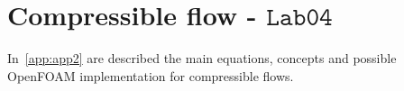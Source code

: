 
\section{Compressible flow - $\mathtt{Lab04}$}
    
    \renewcommand{\thepage}{\arabic{page}}
    \setcounter{page}{\thelastPage}
In~\ref{app:app2} are described the main equations, concepts and possible OpenFOAM implementation for compressible flows.



